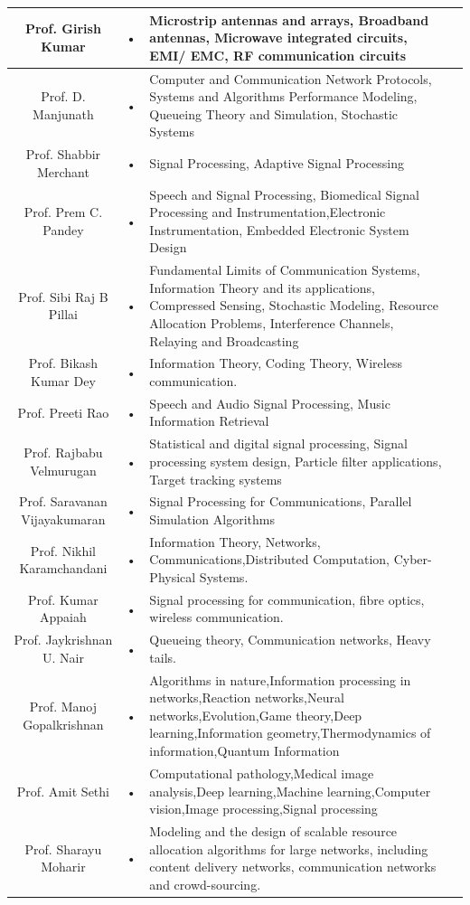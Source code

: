 \documentclass[11pt,fleqn,openany]{book} %
\begin{document}
\begin{tabular}{|c|c|p{6cm}|c}
\hline 
Prof. Girish Kumar  & • & Microstrip antennas and arrays, Broadband antennas, Microwave integrated circuits, EMI/ EMC, RF communication circuits \\ 
\hline 
Prof. D. Manjunath & • & Computer and Communication Network Protocols, Systems and Algorithms Performance Modeling, Queueing Theory and Simulation, Stochastic
Systems \\ 
\hline 
Prof. Shabbir Merchant & • & Signal Processing, Adaptive Signal Processing \\ 
\hline 
Prof. Prem C. Pandey & • & Speech and Signal Processing, Biomedical Signal Processing and Instrumentation,Electronic Instrumentation, Embedded Electronic System Design \\ 
\hline 
Prof. Sibi Raj B Pillai  & • & Fundamental Limits of Communication Systems, Information Theory and its applications, Compressed Sensing, Stochastic Modeling, Resource Allocation Problems, Interference Channels, Relaying and Broadcasting \\ 
\hline 
Prof. Bikash Kumar Dey & • & Information Theory, Coding Theory, Wireless communication. \\ 
\hline 
Prof. Preeti Rao & • & Speech and Audio Signal Processing, Music Information Retrieval \\ \hline 
Prof. Rajbabu Velmurugan & • & Statistical and digital signal processing, Signal processing system design, Particle filter applications, Target tracking systems \\ 
\hline 
Prof. Saravanan Vijayakumaran & • & Signal Processing for Communications, Parallel Simulation Algorithms \\ 
\hline 
Prof. Nikhil Karamchandani & • & Information Theory, Networks, Communications,Distributed Computation, Cyber-Physical Systems. \\ 
\hline 
Prof. Kumar Appaiah & • & Signal processing for communication, fibre optics, wireless communication. \\ 
\hline 
Prof. Jaykrishnan U. Nair & • & Queueing theory, Communication networks, Heavy tails. \\ 
\hline 
Prof. Manoj Gopalkrishnan & • & Algorithms in nature,Information processing in networks,Reaction networks,Neural networks,Evolution,Game theory,Deep learning,Information geometry,Thermodynamics of information,Quantum Information\\ 
\hline 
Prof. Amit Sethi & • & Computational pathology,Medical image analysis,Deep learning,Machine learning,Computer vision,Image processing,Signal processing \\ 
\hline 
Prof. Sharayu Moharir & • & Modeling and the design of scalable resource allocation algorithms for large networks, including content delivery networks, communication
networks and crowd-sourcing. \\ 
\hline 
\end{tabular} 
\end{document}
